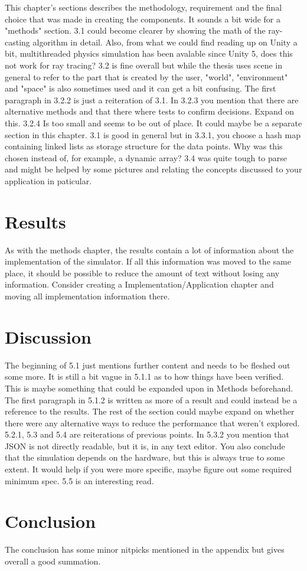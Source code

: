 \documentclass[12pt,a4paper,twoside,openright]{report}
\begin{document}
	This chapter's sections describes the methodology, requirement and the
	final choice that was made in creating the components. It sounds a bit wide
	for a "methods" section. 3.1 could become clearer by showing the math of
	the ray-casting algorithm in detail. Also, from what we could find reading
	up on Unity a bit, multithreaded physics simulation has been avalable since
	Unity 5, does this not work for ray tracing? 3.2 is fine overall but while
	the thesis uses scene in general to refer to the part that is created by
	the user, "world", "environment" and "space" is also sometimes used and it
	can get a bit confusing. The first paragraph in 3.2.2 is just a reiteration
	of 3.1. In 3.2.3 you mention that there are alternative methods and that
	there where tests to confirm decisions. Expand on this. 3.2.4 Is too small
	and seems to be out of place.  It could maybe be a separate section in this
	chapter. 3.1 is good in general but in 3.3.1, you choose a hash map 
	containing linked lists as storage structure for the data points. Why was 
	this chosen instead of, for example, a dynamic array? 3.4 was quite tough
	to parse and might be helped by some pictures and relating the concepts
	discussed to your application in paticular.

\section*{Results}

	As with the methods chapter, the results contain a lot of information about
	the implementation of the simulator. If all this information was moved to
	the same place, it should be possible to reduce the amount of text without
	losing any information. Consider creating a Implementation/Application 
	chapter and moving all implementation information there.

\section*{Discussion}

	The beginning of 5.1 just mentions further content and needs to be fleshed 
	out	some more. It is still a bit vague in 5.1.1 as to how things have been
	verified. This is maybe something that could be expanded upon in Methods
	beforehand. The first paragraph in 5.1.2 is written as more of a result and
	could instead be a reference to the results. The rest of the section could
	maybe expand on whether there were any alternative ways to reduce the
	performance that weren't explored. 5.2.1, 5.3 and 5.4 are reiterations of
	previous points. In 5.3.2 you mention that JSON is not directly readable, 
	but it is, in any text editor. You also conclude that the simulation 
	depends on the hardware, but this is always true to some extent. It would 
	help if you were more specific, maybe figure out some required minimum 
	spec. 5.5 is an interesting read.

\section*{Conclusion}

	The conclusion has some minor nitpicks mentioned in the appendix but gives
	overall a good summation.
\end{document}
